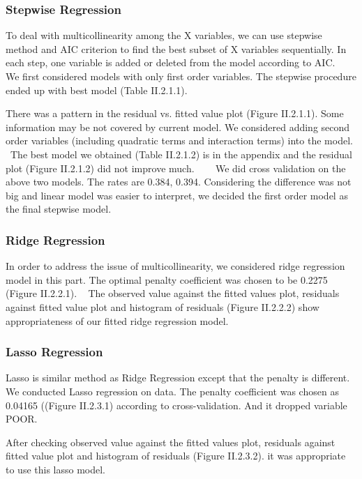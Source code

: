 \documentclass{article}
\begin{document}
    \subsubsection{Stepwise Regression}
       To deal with multicollinearity among the X variables, we can use stepwise method and AIC criterion to find the best subset of X variables sequentially. In each step, one variable is added or deleted from the model according to AIC.  
       We first considered models with only first order variables. The stepwise procedure ended up with best model (Table II.2.1.1).

       There was a pattern in the residual vs. fitted value plot (Figure II.2.1.1). Some information may be not covered by current model. We considered adding second order variables (including quadratic terms and interaction terms) into the model.  The best model we obtained (Table II.2.1.2) is in the appendix and the residual plot (Figure II.2.1.2) did not improve much.
          
       We did cross validation on the above two models. The rates are 0.384, 0.394. Considering the difference was not big and linear model was easier to interpret, we decided the first order model as the final stepwise model.

    \subsubsection{Ridge Regression}
       In order to address the issue of multicollinearity, we considered ridge regression model in this part. The optimal penalty coefficient was chosen to be 0.2275 (Figure II.2.2.1).
        
       The observed value against the fitted values plot, residuals against fitted value plot and histogram of residuals (Figure II.2.2.2) show appropriateness of our fitted ridge regression model.

    \subsubsection{Lasso Regression}
       Lasso is similar method as Ridge Regression except that the penalty is different. We conducted Lasso regression on data. The penalty coefficient was chosen as 0.04165 ((Figure II.2.3.1) according to cross-validation. And it dropped variable POOR.

       After checking observed value against the fitted values plot, residuals against fitted value plot and histogram of residuals (Figure II.2.3.2). it was appropriate to use this lasso model.
\end{document}
